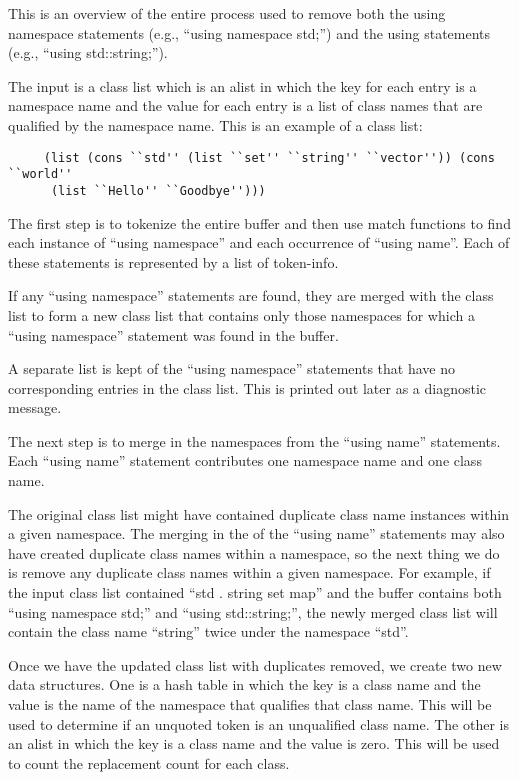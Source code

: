 \begin{doc-string}
This is an overview of the entire process used to remove both the using
namespace statements (e.g., ``using namespace std;'') and the using statements
(e.g., ``using std::string;'').

The input is a class list which is an alist in which the key for each entry is a
namespace name and the value for each entry is a list of class names that are
qualified by the namespace name.  This is an example of a class list:

\small{\begin{verbatim}
     (list (cons ``std'' (list ``set'' ``string'' ``vector'')) (cons ``world''
      (list ``Hello'' ``Goodbye'')))
\end{verbatim}}

The first step is to tokenize the entire buffer and then use match functions to
find each instance of ``using namespace'' and each occurrence of ``using name''.
Each of these statements is represented by a list of token-info.

If any ``using namespace'' statements are found, they are merged with the class
list to form a new class list that contains only those namespaces for which a
``using namespace'' statement was found in the buffer.

A separate list is kept of the ``using namespace'' statements that have no
corresponding entries in the class list.  This is printed out later as a
diagnostic message.

The next step is to merge in the namespaces from the ``using name'' statements.
Each ``using name'' statement contributes one namespace name and one class name.

The original class list might have contained duplicate class name instances
within a given namespace.  The merging in the of the ``using name'' statements
may also have created duplicate class names within a namespace, so the next
thing we do is remove any duplicate class names within a given namespace.  For
example, if the input class list contained ``std . string set map'' and the
buffer contains both ``using namespace std;'' and ``using std::string;'', the
newly merged class list will contain the class name ``string'' twice under the
namespace ``std''.

Once we have the updated class list with duplicates removed, we create two new
data structures.  One is a hash table in which the key is a class name and the
value is the name of the namespace that qualifies that class name.  This will be
used to determine if an unquoted token is an unqualified class name.  The other
is an alist in which the key is a class name and the value is zero.  This will
be used to count the replacement count for each class.


\end{doc-string}
